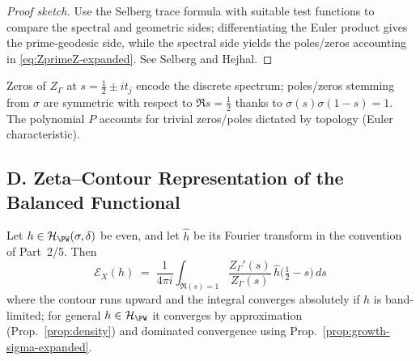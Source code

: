 \begin{proof}[Proof sketch]
Use the Selberg trace formula with suitable test functions to compare the spectral and geometric sides; differentiating the Euler product gives the prime-geodesic side, while the spectral side yields the poles/zeros accounting in \eqref{eq:ZprimeZ-expanded}. See Selberg and Hejhal.
\end{proof}

\begin{remark}
Zeros of $Z_\Gamma$ at $s=\tfrac12\pm it_j$ encode the discrete spectrum; poles/zeros stemming from $\sigma$ are symmetric with respect to $\Re s=\tfrac12$ thanks to $\sigma(s)\sigma(1-s)=1$. The polynomial $P$ accounts for trivial zeros/poles dictated by topology (Euler characteristic).
\end{remark}


\subsection*{D. Zeta–Contour Representation of the Balanced Functional}
\label{subsec:zeta-contour-expanded}

\begin{theorem}
\label{thm:balanced-zeta-expanded}
Let $h\in\mathcal H_{\PW}(\sigma,\delta)$ be even, and let $\hat h$ be its Fourier transform in the convention of Part~2/5. Then
\begin{equation}
\label{eq:balanced-zeta-contour-expanded}
  \boxed{\quad
  \mathcal E_X(h) \;=\; \frac{1}{4\pi i}\int_{\Re(s)=1}
     \frac{Z_\Gamma'(s)}{Z_\Gamma(s)}\,\hat h\!\Big(\tfrac12-s\Big)\,ds \quad}
\end{equation}
where the contour runs upward and the integral converges absolutely if $h$ is band-limited; for general $h\in\mathcal H_{\PW}$ it converges by approximation (Prop.~\ref{prop:density}) and dominated convergence using Prop.~\ref{prop:growth-sigma-expanded}.
\end{theorem}

